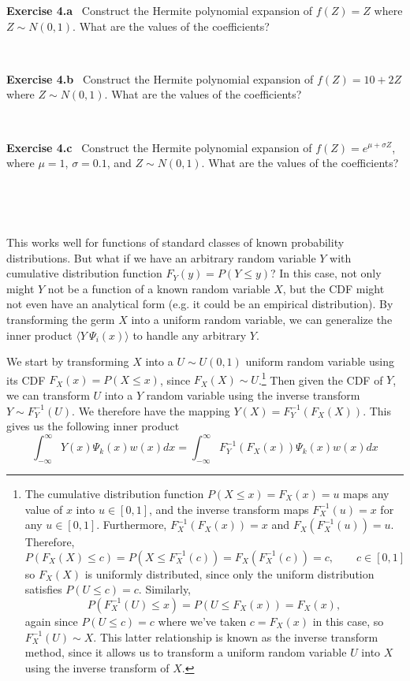\documentclass[11pt]{article}
\numberwithin{equation}{section}
\begin{document}
\textbf{Exercise 4.a} \ Construct the Hermite polynomial expansion of $f(Z) = Z$ where $Z \sim N(0,1)$. What are the values of the coefficients?

\

\textbf{Exercise 4.b} \ Construct the Hermite polynomial expansion of $f(Z) = 10 + 2Z$ where $Z \sim N(0,1)$. What are the values of the coefficients?

\

\textbf{Exercise 4.c} \ Construct the Hermite polynomial expansion of $f(Z) = e^{\mu + \sigma Z}$, where $\mu = 1$, $\sigma = 0.1$, and $Z \sim N(0,1)$. What are the values of the coefficients?

\

\



This works well for functions of standard classes of known probability distributions. But what if we have an arbitrary random variable $Y$ with cumulative distribution function $F_Y(y) = P(Y \leq y)$? In this case, not only might $Y$ not be a function of a known random variable $X$, but the CDF might not even have an analytical form (e.g. it could be an empirical distribution). By transforming the germ $X$ into a uniform random variable, we can generalize the inner product $\langle Y \ \Psi_i(x) \rangle$ to handle any arbitrary $Y$.

\qquad We start by transforming $X$ into a $U \sim U(0,1)$ uniform random variable using its CDF $F_X(x) = P(X \leq x)$, since $F_X(X) \sim U$.\footnote{The cumulative distribution function $P(X \leq x) = F_X(x) = u$ maps any value of $x$ into $u \in [0, 1]$, and the inverse transform maps $F_X^{-1}(u) = x$ for any $u \in [0, 1]$. Furthermore, $F_X^{-1}(F_X(x)) = x$ and $F_X(F_X^{-1}(u)) = u$. Therefore, 
\begin{equation*}
P(F_X(X) \leq c) = P(X \leq F_X^{-1}(c)) = F_X(F_X^{-1}(c)) = c, \qquad c \in [0, 1]
\end{equation*}
so $F_X(X)$ is uniformly distributed, since only the uniform distribution satisfies $P(U \leq c) = c$. Similarly,
\begin{equation*}
P(F_X^{-1}(U) \leq x) = P(U \leq F_X(x)) = F_X(x),
\end{equation*}
again since $P(U \leq c) = c$ where we've taken $c = F_X(x)$ in this case, so $F_X^{-1}(U) \sim X$. This latter relationship is known as the inverse transform method, since it allows us to transform a uniform random variable $U$ into $X$ using the inverse transform of $X$.}
Then given the CDF of $Y$, we can transform $U$ into a $Y$ random variable using the inverse transform $Y \sim F_Y^{-1}(U)$. We therefore have the mapping $Y(X) = F_Y^{-1} (F_X(X))$. This gives us the following inner product
\begin{equation}
\int_{-\infty}^{\infty} Y(x) \Psi_k(x) w(x) dx = \int_{-\infty}^{\infty} F_Y^{-1} (F_X(x)) \Psi_k(x) w(x) dx \label{ip_arb}
\end{equation}
\end{document}
